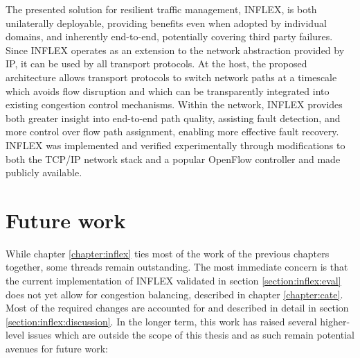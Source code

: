 The presented solution for resilient traffic management, INFLEX, is both unilaterally deployable, providing benefits even when adopted by individual domains, and inherently end-to-end, potentially covering third party failures.
Since INFLEX operates as an extension to the network abstraction provided by \ac{IP}, it can be used by all transport protocols.
At the host, the proposed architecture allows transport protocols to switch network paths at a timescale which avoids flow disruption and which can be transparently integrated into existing congestion control mechanisms.
Within the network, INFLEX provides both greater insight into end-to-end path quality, assisting fault detection, and more control over flow path assignment, enabling more effective fault recovery. 
INFLEX was implemented and verified experimentally through modifications to both the \ac{TCP}/\ac{IP} network stack and a popular OpenFlow controller \cite{pox} and made publicly available.



\section{Future work}

While chapter \ref{chapter:inflex} ties most of the work of the previous chapters together, some threads remain outstanding.
The most immediate concern is that the current implementation of INFLEX validated in section \ref{section:inflex:eval} does not yet allow for congestion balancing, described in chapter \ref{chapter:cate}.
Most of the required changes are accounted for and described in detail in section \ref{section:inflex:discussion}.
In the longer term, this work has raised several higher-level issues which are outside the scope of this thesis and as such remain potential avenues for future work:


